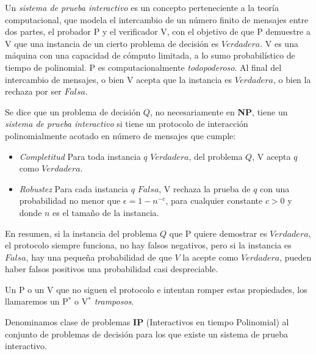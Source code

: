 Un \textit{sistema de prueba interactivo} es un concepto perteneciente a la teoría computacional, que modela el intercambio de un número finito de mensajes entre dos partes, el probador P y el verificador V, con el objetivo de que P demuestre a V que una instancia de un cierto problema de decisión es $Verdadera$. V es una máquina con una capacidad de cómputo limitada, a lo sumo probabilístico de tiempo de polinomial. P es computacionalmente \textit{todopoderoso}. Al final del intercambio de mensajes, o bien V acepta que la instancia es $Verdadera$, o bien la rechaza por ser $Falsa$.

\begin{definition}

	
	Se dice que un problema de decisión $Q$, no necesariamente en \textbf{NP},  tiene un \textit{sistema de prueba interactivo} si tiene un protocolo de interacción polinomialmente acotado en número de mensajes que cumple:
	
	\begin{itemize}
		\item \textit{Completitud} Para toda instancia $q$ $Verdadera$, del problema $Q$, V acepta $q$ como $Verdadera$.
		\item \textit{Robustez} Para cada instancia $q$ $Falsa$, V rechaza la prueba de $q$ con una probabilidad no menor que $\epsilon = 1-n^{-c}$, para cualquier constante $c>0$ y donde $n$ es el tamaño de la instancia.
	\end{itemize}

\end{definition}

En resumen, si la instancia del problema $Q$ que P quiere demostrar es $Verdadera$, el protocolo siempre funciona, no hay falsos negativos, pero si la instancia es $Falsa$, hay una pequeña probabilidad de que $V$ la acepte como $Verdadera$, pueden haber falsos positivos una probabilidad casi despreciable.


Un P o un V que no siguen el protocolo e intentan romper estas propiedades, los llamaremos un P$^*$ o V$^*$ \textit{tramposos}.


\begin{definition}
	Denominamos clase de problemas \textbf{IP} (Interactivos en tiempo Polinomial) al conjunto de problemas de decisión para los que existe un sistema de prueba interactivo.
\end{definition}

